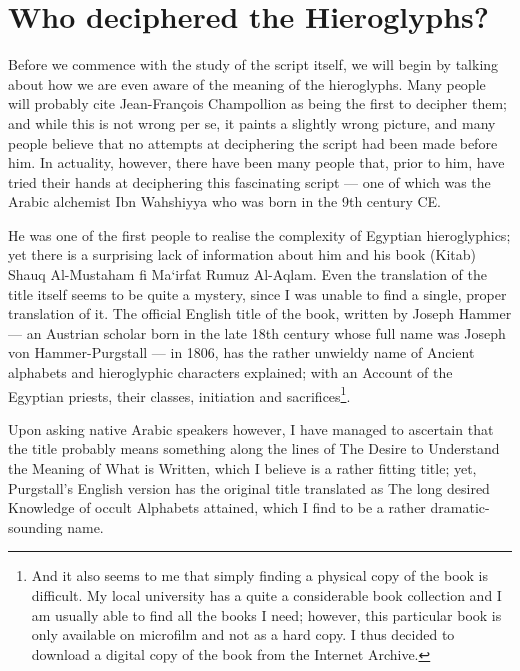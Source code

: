 \documentclass[a5paper,twoside,11pt]{report}
\begin{document}
\thispagestyle{empty}
  \mbox{}
  \newpage

\chapter*{Who deciphered the Hieroglyphs?}
  Before we commence with the study of the script itself, we will begin by talking about how we are even aware of the meaning of the hieroglyphs. Many people will probably cite Jean-François Champollion as being the first to decipher them; and while this is not wrong per se, it paints a slightly wrong picture, and many people believe that no attempts at deciphering the script had been made before him. In actuality, however, there have been many people that, prior to him, have tried their hands at deciphering this fascinating script — one of which was the Arabic alchemist Ibn Wahshiyya who was born in the 9th century CE.

	He was one of the first people to realise the complexity of Egyptian hieroglyphics; yet there is a surprising lack of information about him and his book (Kitab) Shauq Al-Mustaham fi Ma‘irfat Rumuz Al-Aqlam. Even the translation of the title itself seems to be quite a mystery, since I was unable to find a single, proper translation of it. The official English title of the book, written by Joseph Hammer — an Austrian scholar born in the late 18th century whose full name was Joseph von Hammer-Purgstall — in 1806, has the rather unwieldy name of Ancient alphabets and hieroglyphic characters explained; with an Account of the Egyptian priests, their classes, initiation and sacrifices\footnote{And it also seems to me that simply finding a physical copy of the book is difficult. My local university has a quite a considerable book collection and I am usually able to find all the books I need; however, this particular book is only available on microfilm and not as a hard copy. I thus decided to download a digital copy of the book from the Internet Archive.}.

	Upon asking native Arabic speakers however, I have managed to ascertain that the title probably means something along the lines of The Desire to Understand the Meaning of What is Written, which I believe is a rather fitting title; yet, Purgstall’s English version has the original title translated as The long desired Knowledge of occult Alphabets attained, which I find to be a rather dramatic-sounding name. 
\end{document}
